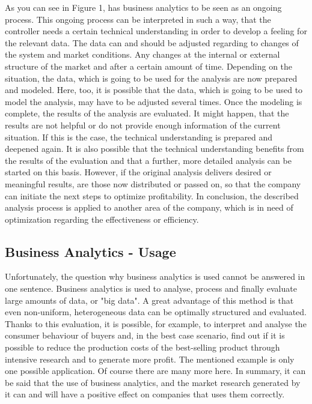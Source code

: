 \documentclass[12pt,twocolumn,twoside]{conference}   %
\begin{document}
As you can see in Figure 1, has business analytics to be seen as an ongoing process. This ongoing process can be interpreted in such a way, that the controller needs a certain technical understanding in order to develop a feeling for the relevant data. The data can and should be adjusted regarding to changes of the system and market conditions. Any changes at the internal or external structure of the market and after a certain amount of time. Depending on the situation, the data, which is going to be used for the analysis are now prepared and modeled. Here, too, it is possible that the data, which is going to be used to model the analysis, may have to be adjusted several times. Once the modeling is complete, the results of the analysis are evaluated. It might happen, that the results are not helpful or do not provide enough information of the current situation. If this is the case, the technical understanding is prepared and deepened again. It is also possible that the technical understanding benefits from the results of the evaluation and that a further, more detailed analysis can be started on this basis. However, if the original analysis delivers desired or meaningful results, are those now distributed or passed on, so that the company can initiate the next steps to optimize profitability. In conclusion, the described analysis process is applied to another area of the company, which is in need of optimization regarding the effectiveness or efficiency.

\subsection{Business Analytics - Usage}
Unfortunately, the question why business analytics is used cannot be answered in one sentence. Business analytics is used to analyse, process and finally evaluate large amounts of data, or "big data". A great advantage of this method is that even non-uniform, heterogeneous data can be optimally structured and evaluated. Thanks to this evaluation, it is possible, for example, to interpret and analyse the consumer behaviour of buyers and, in the best case scenario, find out if it is possible to reduce the production costs of the best-selling product through intensive research and to generate more profit. The mentioned example is only one possible application. Of course there are many more here. In summary, it can be said that the use of business analytics, and the market research generated by it can and will have a positive effect on companies that uses them correctly.
\end{document}
